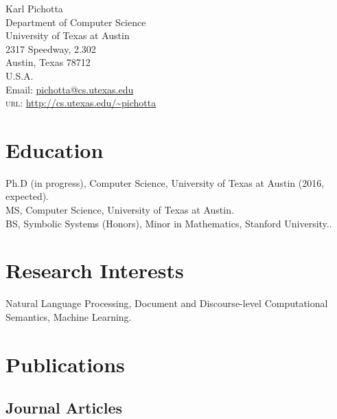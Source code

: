 \documentclass[11pt, letterpaper]{article} %
\newcommand{\years}[1]{\marginnote{\scriptsize #1}} %
\begin{document}

{\LARGE Karl Pichotta}\\[1cm] %
Department of Computer Science \\
  University of Texas at Austin \\
  2317 Speedway, 2.302 \\
	Austin, Texas 78712 \\
U.S.A.\\[.2cm]
Email: \href{mailto:pichotta@cs.utexas.edu}{pichotta@cs.utexas.edu}\\ %
\textsc{url}: \url{http://cs.utexas.edu/~pichotta}\\ 




\section*{Education}

  \years{}Ph.D (in progress), Computer Science, University of 
  Texas at Austin (2016, expected). \\
  \years{2013}MS, Computer Science, University of Texas at Austin. \\
  \years{2008}BS, Symbolic Systems (Honors), Minor in Mathematics, Stanford 
  University..



\section*{Research Interests}

Natural Language Processing,
Document and Discourse-level Computational Semantics,
Machine Learning.


\section*{Publications}

\subsection*{Journal Articles}
\end{document}
